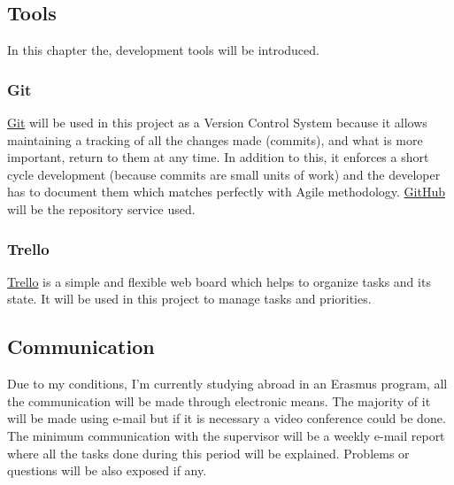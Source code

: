 \subsection{Tools}
In this chapter the, development tools will be introduced. 
\subsubsection{Git}
\href{https://git-scm.com/}{Git} will be used in this project as a Version Control System because it allows maintaining a tracking of all the changes made (commits), and what is more important, return to them at any time. In addition to this, it enforces a short cycle development (because commits are small units of work) and the developer has to document them which matches perfectly with Agile methodology. \href{https://github.com}{GitHub} will be the repository service used.
\subsubsection{Trello}
\href{https://trello.com}{Trello} is a simple and flexible web board which helps to organize tasks and its state. It will be used in this project to manage tasks and priorities.  

\subsection{Communication}
Due to my conditions, I'm currently studying abroad in an Erasmus program, all the communication will be made through electronic means. The majority of it will be made using e-mail but if it is necessary a video conference could be done. \\
The minimum communication with the supervisor will be a weekly e-mail report where all the tasks done during this period will be explained. Problems or questions will be also exposed if any.

